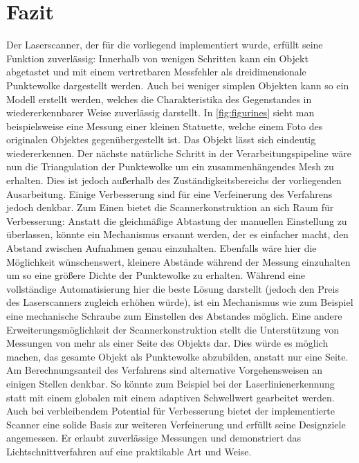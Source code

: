 \chapter{Fazit}
Der Laserscanner, der für die vorliegend implementiert wurde, erfüllt seine Funktion zuverlässig: Innerhalb von wenigen Schritten kann ein Objekt abgetastet und mit einem vertretbaren Messfehler als dreidimensionale Punktewolke dargestellt werden. Auch bei weniger simplen Objekten kann so ein Modell erstellt werden, welches die Charakteristika des Gegenstandes in wiedererkennbarer Weise zuverlässig darstellt. In \ref{fig:figurines} sieht man beispielsweise eine Messung einer kleinen Statuette, welche einem Foto des originalen Objektes gegenübergestellt ist. Das Objekt lässt sich eindeutig wiedererkennen. Der nächste natürliche Schritt in der Verarbeitungspipeline wäre nun die Triangulation der Punktewolke um ein zusammenhängendes Mesh zu erhalten. Dies ist jedoch außerhalb des Zu\-stän\-dig\-keits\-bereichs der vorliegenden Ausarbeitung.\newline
Einige Verbesserung sind für eine Verfeinerung des Verfahrens jedoch denkbar. Zum Einen bietet die Scannerkonstruktion an sich Raum für Verbesserung: Anstatt die gleichmäßige Abtastung der manuellen Einstellung zu überlassen, könnte ein Mechanismus ersannt werden, der es einfacher macht, den Abstand zwischen Aufnahmen genau einzuhalten. Ebenfalls wäre hier die Möglichkeit wünschenswert, kleinere Abstände während der Messung einzuhalten um so eine größere Dichte der Punktewolke zu erhalten. Während eine vollständige Automatisierung hier die beste Lösung darstellt (jedoch den Preis des Laserscanners zugleich erhöhen würde), ist ein Mechanismus wie zum Beispiel eine mechanische Schraube zum Einstellen des Abstandes möglich. Eine andere Erweiterungsmöglichkeit der Scannerkonstruktion stellt die Unterstützung von Messungen von mehr als einer Seite des Objekts dar. Dies würde es möglich machen, das gesamte Objekt als Punktewolke abzubilden, anstatt nur eine Seite. Am Berechnungsanteil des Verfahrens sind alternative Vorgehensweisen an einigen Stellen denkbar. So könnte zum Beispiel bei der Laserlinienerkennung statt mit einem globalen mit einem adaptiven Schwellwert gearbeitet werden. \newline
Auch bei verbleibendem Potential für Verbesserung bietet der implementierte Scanner eine solide Basis zur weiteren Verfeinerung und erfüllt seine Designziele angemessen. Er erlaubt zuverlässige Messungen und demonstriert das Lichtschnittverfahren auf eine praktikable Art und Weise. 

